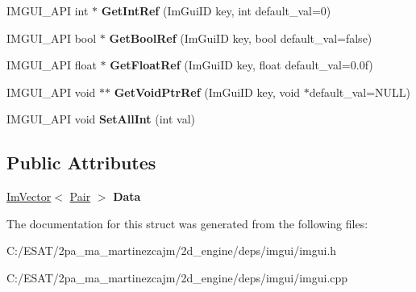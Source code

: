 \begin{DoxyCompactItemize}
\mbox{\label{struct_im_gui_storage_a28673fa7839263f3066ccb8e93e748a9}} 
I\+M\+G\+U\+I\+\_\+\+A\+PI int $\ast$ {\bfseries Get\+Int\+Ref} (Im\+Gui\+ID key, int default\+\_\+val=0)
\item 
\mbox{\label{struct_im_gui_storage_aeb0d62100453d710bac5f6ad0a6e6a2e}} 
I\+M\+G\+U\+I\+\_\+\+A\+PI bool $\ast$ {\bfseries Get\+Bool\+Ref} (Im\+Gui\+ID key, bool default\+\_\+val=false)
\item 
\mbox{\label{struct_im_gui_storage_a4b51cc8c92c65d4224af65a8ce7752ee}} 
I\+M\+G\+U\+I\+\_\+\+A\+PI float $\ast$ {\bfseries Get\+Float\+Ref} (Im\+Gui\+ID key, float default\+\_\+val=0.\+0f)
\item 
\mbox{\label{struct_im_gui_storage_a2b203317f3f488818e9b9f416fe35332}} 
I\+M\+G\+U\+I\+\_\+\+A\+PI void $\ast$$\ast$ {\bfseries Get\+Void\+Ptr\+Ref} (Im\+Gui\+ID key, void $\ast$default\+\_\+val=N\+U\+LL)
\item 
\mbox{\label{struct_im_gui_storage_ae5ee60618c4ce8e2b4ce0e5543d52992}} 
I\+M\+G\+U\+I\+\_\+\+A\+PI void {\bfseries Set\+All\+Int} (int val)
\end{DoxyCompactItemize}
\subsection*{Public Attributes}
\begin{DoxyCompactItemize}
\item 
\mbox{\label{struct_im_gui_storage_aab0b9789fac598a34c500459259fde42}} 
\hyperlink{class_im_vector}{Im\+Vector}$<$ \hyperlink{struct_im_gui_storage_1_1_pair}{Pair} $>$ {\bfseries Data}
\end{DoxyCompactItemize}


The documentation for this struct was generated from the following files\+:\begin{DoxyCompactItemize}
\item 
C\+:/\+E\+S\+A\+T/2pa\+\_\+ma\+\_\+martinezcajm/2d\+\_\+engine/deps/imgui/imgui.\+h\item 
C\+:/\+E\+S\+A\+T/2pa\+\_\+ma\+\_\+martinezcajm/2d\+\_\+engine/deps/imgui/imgui.\+cpp\end{DoxyCompactItemize}
